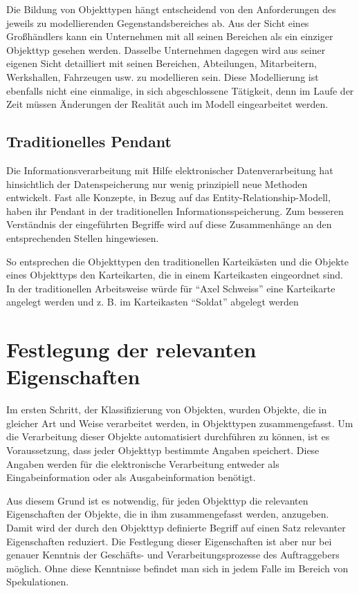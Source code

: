         Die Bildung von Objekttypen hängt entscheidend von den Anforderungen
        des jeweils zu modellierenden Gegenstandsbereiches ab. Aus der Sicht
        eines Großhändlers kann ein Unternehmen mit all seinen Bereichen
        als ein einziger Objekttyp gesehen werden. Dasselbe Unternehmen dagegen
        wird aus seiner eigenen Sicht detailliert mit seinen Bereichen,
        Abteilungen, Mitarbeitern, Werkshallen, Fahrzeugen usw. zu modellieren
        sein. Diese Modellierung ist ebenfalls nicht eine einmalige, in sich
        abgeschlossene Tätigkeit, denn im Laufe der Zeit müssen Änderungen
        der Realität auch im Modell eingearbeitet werden.
      \subsection{Traditionelles Pendant}
        Die Informationsverarbeitung mit Hilfe elektronischer Datenverarbeitung
        hat hinsichtlich der Datenspeicherung nur wenig prinzipiell neue
        Methoden entwickelt. Fast alle Konzepte, in Bezug auf das
        Entity-Relationship-Modell, haben ihr Pendant in der traditionellen
        Informationsspeicherung. Zum besseren Verständnis der eingeführten
        Begriffe wird auf diese Zusammenhänge an den entsprechenden Stellen
        hingewiesen.

        So entsprechen die Objekttypen den traditionellen Karteikästen und die
        Objekte eines Objekttyps den Karteikarten, die in einem Karteikasten
        eingeordnet sind. In der traditionellen Arbeitsweise würde für
        \enquote{Axel Schweiss} eine Karteikarte angelegt werden und z. B. im
        Karteikasten \enquote{Soldat} abgelegt werden
\clearpage
    \section{Festlegung der relevanten Eigenschaften}
      Im ersten Schritt, der Klassifizierung von Objekten, wurden Objekte, die
      in gleicher Art und Weise verarbeitet werden, in Objekttypen
      zusammengefasst. Um die Verarbeitung dieser Objekte automatisiert
      durchführen zu können, ist es Voraussetzung, dass jeder Objekttyp
      bestimmte Angaben speichert. Diese Angaben werden für die elektronische
      Verarbeitung entweder als Eingabeinformation oder als Ausgabeinformation
      benötigt.
      
      Aus diesem Grund ist es notwendig, für jeden Objekttyp die relevanten
      Eigenschaften der Objekte, die in ihm zusammengefasst werden, anzugeben.
      Damit wird der durch den Objekttyp definierte Begriff auf einen Satz
      relevanter Eigenschaften reduziert. Die Festlegung dieser Eigenschaften
      ist aber nur bei genauer Kenntnis der Geschäfts- und
      Verarbeitungsprozesse des Auftraggebers möglich. Ohne diese Kenntnisse
      befindet man sich in jedem Falle im Bereich von Spekulationen.
